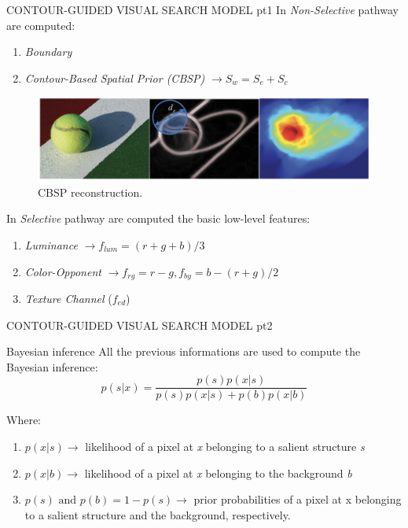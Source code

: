 \documentclass[10pt]{beamer}
\begin{document}
\begin{frame}[t]{CONTOUR-GUIDED VISUAL SEARCH MODEL pt1}
    In \emph{Non-Selective} pathway are computed:
    \begin{enumerate}
        \item \emph{Boundary} 
        \item \emph{Contour-Based Spatial Prior (CBSP)} $ \rightarrow S_w = S_e + S_c $
    \end{enumerate}
    \begin{figure}[htbp]
        \centering
        \includegraphics[width = 0.5\linewidth]{images/paper1/CBSP.png}
        \centering
        \caption{CBSP reconstruction.}\vspace{0mm}
        \label{fid: CBSP}
    \end{figure}
    In \emph{Selective} pathway are computed the basic low-level features:
    \begin{enumerate}
        \item \emph{Luminance} $ \rightarrow f_{lum} = (r+g+b)/3 $
        \item \emph{Color-Opponent} $ \rightarrow f_{rg} = r-g , f_{by} = b-(r+g)/2 $
        \item \emph{Texture Channel} ($ f_{ed} $)
    \end{enumerate}
\end{frame}

\begin{frame}[t]{CONTOUR-GUIDED VISUAL SEARCH MODEL pt2}
    \begin{block}{Bayesian inference}
        All the previous informations are used to compute the Bayesian inference:
        $$ p(s|x) = \frac{p(s)p(x|s)}{p(s)p(x|s)+p(b)p(x|b) } $$
    \end{block}
    Where:
    \begin{enumerate}
        \item $ p(x|s) \rightarrow $ likelihood of a pixel at \emph{x} belonging to a salient structure \emph{s}
        \item $ p(x|b) \rightarrow $ likelihood of a pixel at \emph{x} belonging to the background \emph{b}
        \item $ p(s) \mbox{ and } p(b)=1-p(s) \rightarrow $ prior probabilities of a pixel at x belonging to a salient structure and the background, respectively.
    \end{enumerate}
\end{frame}
\end{document}
